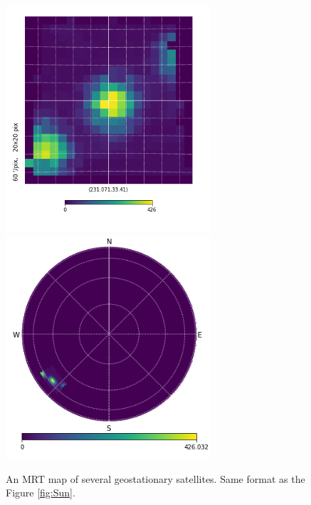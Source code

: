 \documentclass[11pt,letterpaper]{spie}
\begin{document}
\begin{figure}[h]
\centering
\includegraphics[width=3in]{mrt_sat_gnom.png}
\includegraphics[width=3in]{mrt_sat_orth.png}
\vspace{5pt}
\caption{An MRT map of several geostationary satellites.  Same format as the Figure \ref{fig:Sun}.}
\label{fig:Satellites}
\end{figure}

%
\end{document}
